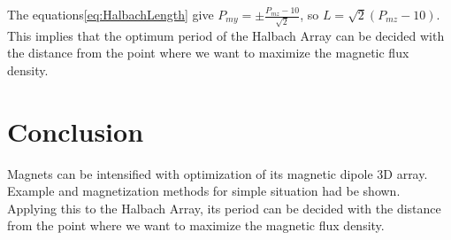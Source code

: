 \documentclass[dvipdfmx]{article}
\begin{document}
The equations\ref{eq:HalbachLength} give $P_{my}=\pm\frac{P_{mz}-10}{\sqrt{2}}$, so $L=\sqrt{2}(P_{mz}-10)$.
This implies that the optimum period of the Halbach Array can be decided with the distance from the point
 where we want to maximize the magnetic flux density.
 
 
\section{Conclusion}
Magnets can be intensified with optimization of its magnetic dipole 3D array.
Example and magnetization methods for simple situation had be shown.
Applying this to the Halbach Array, its period can be decided with the distance from the point
 where we want to maximize the magnetic flux density.
\end{document}
